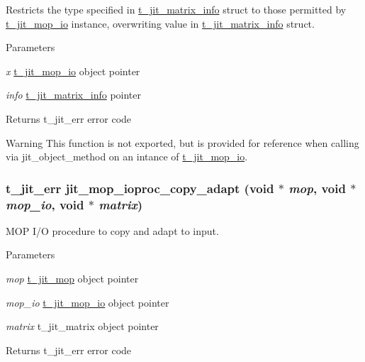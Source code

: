 Restricts the type specified in \hyperlink{structt__jit__matrix__info}{t\_\-jit\_\-matrix\_\-info} struct to those permitted by \hyperlink{structt__jit__mop__io}{t\_\-jit\_\-mop\_\-io} instance, overwriting value in \hyperlink{structt__jit__matrix__info}{t\_\-jit\_\-matrix\_\-info} struct. 
\begin{DoxyParams}{Parameters}
\item[{\em x}]\hyperlink{structt__jit__mop__io}{t\_\-jit\_\-mop\_\-io} object pointer \item[{\em info}]\hyperlink{structt__jit__matrix__info}{t\_\-jit\_\-matrix\_\-info} pointer\end{DoxyParams}
\begin{DoxyReturn}{Returns}
t\_\-jit\_\-err error code
\end{DoxyReturn}
\begin{DoxyWarning}{Warning}
This function is not exported, but is provided for reference when calling via jit\_\-object\_\-method on an intance of \hyperlink{structt__jit__mop__io}{t\_\-jit\_\-mop\_\-io}. 
\end{DoxyWarning}
\hypertarget{group__mopmod_ga9d6c3b36f1e4a7ef30d674eda4196a5c}{
\subsubsection[{jit\_\-mop\_\-ioproc\_\-copy\_\-adapt}]{\setlength{\rightskip}{0pt plus 5cm}t\_\-jit\_\-err jit\_\-mop\_\-ioproc\_\-copy\_\-adapt (void $\ast$ {\em mop}, \/  void $\ast$ {\em mop\_\-io}, \/  void $\ast$ {\em matrix})}}
\label{group__mopmod_ga9d6c3b36f1e4a7ef30d674eda4196a5c}


MOP I/O procedure to copy and adapt to input. 
\begin{DoxyParams}{Parameters}
\item[{\em mop}]\hyperlink{structt__jit__mop}{t\_\-jit\_\-mop} object pointer \item[{\em mop\_\-io}]\hyperlink{structt__jit__mop__io}{t\_\-jit\_\-mop\_\-io} object pointer \item[{\em matrix}]t\_\-jit\_\-matrix object pointer\end{DoxyParams}
\begin{DoxyReturn}{Returns}
t\_\-jit\_\-err error code
\end{DoxyReturn}

